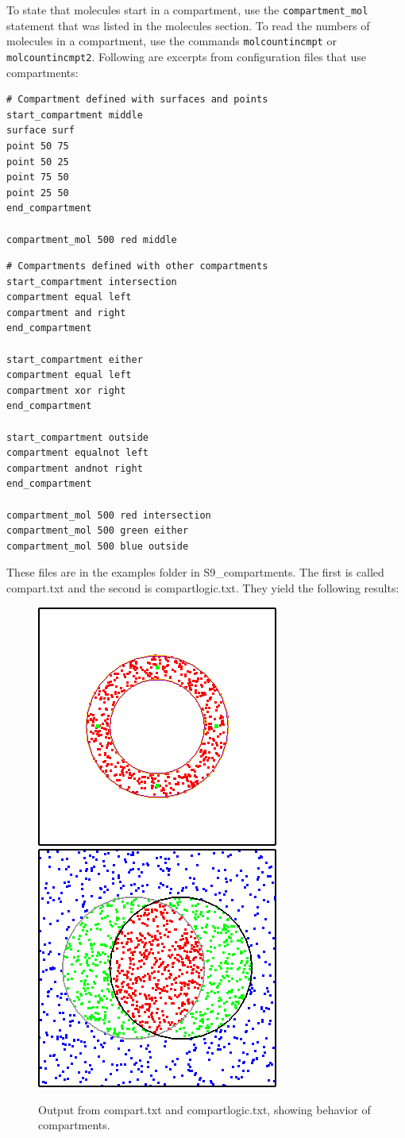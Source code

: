 \documentclass {book}
\newcommand {\ttt} {\texttt}
\begin{document}
To state that molecules start in a compartment, use the \ttt{compartment\_mol} statement that was listed in the molecules section. To read the numbers of molecules in a compartment, use the commands \ttt{molcountincmpt} or \ttt{molcountincmpt2}.
Following are excerpts from configuration files that use compartments:

\begin{lstlisting}[style=SSAC]
# Compartment defined with surfaces and points
start_compartment middle
surface surf
point 50 75
point 50 25
point 75 50
point 25 50
end_compartment

compartment_mol 500 red middle
\end{lstlisting}

\begin{lstlisting}[style=SSAC]
# Compartments defined with other compartments
start_compartment intersection
compartment equal left
compartment and right
end_compartment

start_compartment either
compartment equal left
compartment xor right
end_compartment

start_compartment outside
compartment equalnot left
compartment andnot right
end_compartment

compartment_mol 500 red intersection
compartment_mol 500 green either
compartment_mol 500 blue outside
\end{lstlisting}

These files are in the examples folder in S9\_compartments. The first is called compart.txt and the second is compartlogic.txt. They yield the following results:

\begin{figure}[h]
\centering
\includegraphics[height=5 cm]{figures/image62}
\includegraphics[height=5 cm]{figures/image63}
\caption{Output from compart.txt and compartlogic.txt, showing behavior of compartments.}
\label{fig:compart}
\end{figure}
\end{document}

